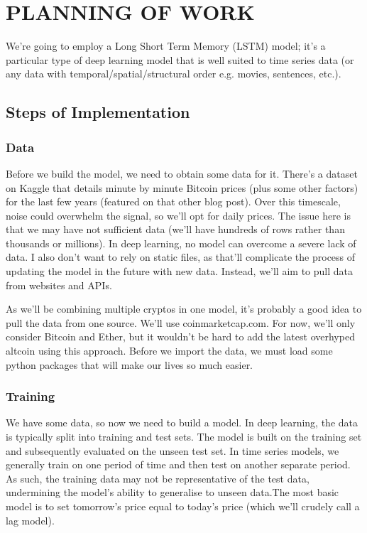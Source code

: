\chapter{PLANNING OF WORK}

We’re going to employ a Long Short Term Memory (LSTM) model; it’s a particular type of deep learning model that is well suited to time series data (or any data with temporal/spatial/structural order e.g. movies, sentences, etc.).


\section{Steps of Implementation}
\subsection{Data}
Before we build the model, we need to obtain some data for it. There’s a dataset on Kaggle that details minute by minute Bitcoin prices (plus some other factors) for the last few years (featured on that other blog post). Over this timescale, noise could overwhelm the signal, so we’ll opt for daily prices. The issue here is that we may have not sufficient data (we’ll have hundreds of rows rather than thousands or millions). In deep learning, no model can overcome a severe lack of data. I also don’t want to rely on static files, as that’ll complicate the process of updating the model in the future with new data. Instead, we’ll aim to pull data from websites and APIs.

As we’ll be combining multiple cryptos in one model, it’s probably a good idea to pull the data from one source. We’ll use coinmarketcap.com. For now, we’ll only consider Bitcoin and Ether, but it wouldn’t be hard to add the latest overhyped altcoin using this approach. Before we import the data, we must load some python packages that will make our lives so much easier.
\subsection{Training}

We have some data, so now we need to build a model. In deep learning, the data is typically split into training and test sets. The model is built on the training set and subsequently evaluated on the unseen test set. In time series models, we generally train on one period of time and then test on another separate period. 
As such, the training data may not be representative of the test data, undermining the model’s ability to generalise to unseen data.The most basic model is to set tomorrow’s price equal to today’s price (which we’ll crudely call a lag model). 

